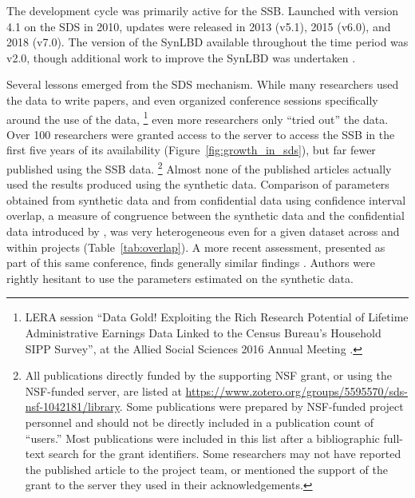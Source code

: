 \documentclass[12pt]{article}
\begin{document}
The development cycle was primarily active for the \ac{SSB}. Launched with version 4.1 on the \ac{SDS} in 2010, updates were released in 2013 (v5.1), 2015 (v6.0), and 2018 (v7.0). The version of the \ac{SynLBD} available throughout the time period was v2.0, though additional work to improve the \ac{SynLBD} was undertaken \citep{SJIAOS-2014d}.




Several lessons emerged from the SDS mechanism. While many researchers used the data to write papers,
%
and even organized conference sessions specifically around the use of the data,%
%
\footnote{LERA session ``Data Gold! Exploiting the Rich Research Potential of Lifetime
Administrative Earnings Data Linked to the Census Bureau’s
Household SIPP Survey'',  at the Allied Social Sciences 2016 Annual Meeting \citep{american_economic_association_allied_2016}. }
%
even more researchers only ``tried out'' the data. Over 100 researchers were granted access to the server to access the SSB in the first five years of its availability (Figure~\ref{fig:growth_in_sds}), but far fewer published using the SSB data.%
%
\footnote{All publications directly funded by the supporting NSF grant, or using the NSF-funded server, are listed at \url{https://www.zotero.org/groups/5595570/sds-nsf-1042181/library}. Some publications were prepared by NSF-funded project personnel and should not be directly included in a publication count of ``users.'' Most publications were included in this list after a bibliographic full-text search for the grant identifiers. Some researchers may not have reported the published article to the project team, or mentioned the support of the grant to the server they used in their acknowledgements.} 
%
Almost none of the published articles actually used the results produced using the synthetic data. Comparison of parameters obtained from synthetic data and from confidential data using confidence interval overlap, a measure of congruence between the synthetic data and the confidential data introduced by \citet{tas2006}, was very heterogeneous even for a given dataset across and within projects (Table~\ref{tab:overlap}). A more recent assessment, presented as part of this same conference, finds generally similar findings \citep{carr-nber-2023,totty-nber-2023}. Authors were rightly  hesitant to use the parameters estimated on the synthetic data. 
\end{document}

